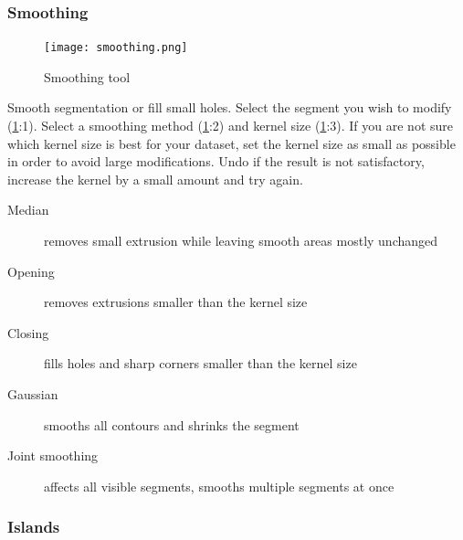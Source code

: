 \subsubsection{Smoothing}
\begin{figure}[h]
	\begin{subfigure}{0.2\textwidth}
		
	\end{subfigure}
\end{figure}


\begin{figure}[h!]
	\centerline{
		\texttt{[image: smoothing.png]}}
	\caption{Smoothing tool}\label{fig:smoothing}
\end{figure}
\noindent
Smooth segmentation or fill small holes.
Select the segment you wish to modify (\cref{fig:smoothing}:1).
Select a smoothing method (\cref{fig:smoothing}:2) and kernel size (\cref{fig:smoothing}:3). If you are not sure which kernel size is best for your dataset, set the kernel size as small as possible in order to avoid large modifications.
Undo if the result is not satisfactory, increase the kernel by a small amount and try again.
\begin{description}
	\item [Median] removes small extrusion while leaving smooth areas mostly unchanged
	\item [Opening] removes extrusions smaller than the kernel size
	\item [Closing] fills holes and sharp corners smaller than the kernel size
	\item [Gaussian] smooths all contours and shrinks the segment
	\item [Joint smoothing] affects all visible segments, smooths multiple segments at once
\end{description}

\pagebreak
\subsubsection{Islands}
\begin{figure}[h]
	\begin{subfigure}{0.2\textwidth}
		
	\end{subfigure}
	\begin{subfigure}{0.2\textwidth}
		
	\end{subfigure}
\end{figure}



